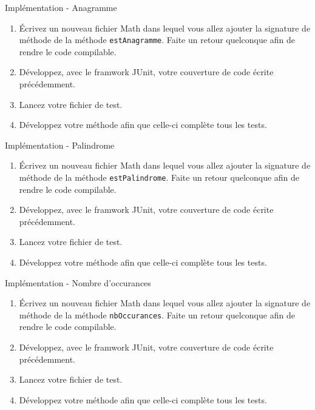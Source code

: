 \documentclass[a4paper,11pt]{article}
\begin{document}
	\begin{Exercice}{Implémentation - Anagramme}
		\begin{enumerate}
			\item Écrivez un nouveau fichier Math dans lequel vous allez ajouter la signature de méthode de la méthode \texttt{estAnagramme}. Faite un retour quelconque afin de rendre le code compilable.
			\item Développez, avec le framwork JUnit, votre couverture de code écrite précédemment.
			\item Lancez votre fichier de test.
			\item Développez votre méthode afin que celle-ci complète tous les tests.
		\end{enumerate}
	\end{Exercice}

	\begin{Exercice}{Implémentation - Palindrome}
		\begin{enumerate}
			\item Écrivez un nouveau fichier Math dans lequel vous allez ajouter la signature de méthode de la méthode \texttt{estPalindrome}. Faite un retour quelconque afin de rendre le code compilable.
			\item Développez, avec le framwork JUnit, votre couverture de code écrite précédemment.
			\item Lancez votre fichier de test.
			\item Développez votre méthode afin que celle-ci complète tous les tests.
		\end{enumerate}
	\end{Exercice}

	\begin{Exercice}{Implémentation - Nombre d'occurances}
		\begin{enumerate}
			\item Écrivez un nouveau fichier Math dans lequel vous allez ajouter la signature de méthode de la méthode \texttt{nbOccurances}. Faite un retour quelconque afin de rendre le code compilable.
			\item Développez, avec le framwork JUnit, votre couverture de code écrite précédemment.
			\item Lancez votre fichier de test.
			\item Développez votre méthode afin que celle-ci complète tous les tests.
		\end{enumerate}
		
	\end{Exercice}
\end{document}
